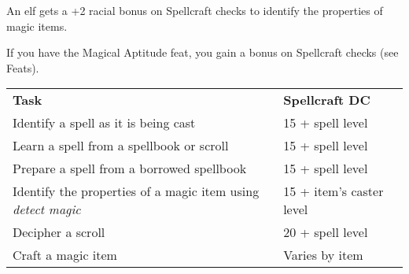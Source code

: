 An elf gets a +2 racial bonus on Spellcraft checks to identify the properties of magic items.
				
If you have the Magical Aptitude feat, you gain a bonus on Spellcraft checks (see Feats).

\begin{table*}
\sffamily
 \begin{tabular}{ll}
\textbf{Task} & \textbf{Spellcraft DC}\\
Identify a spell as it is being cast & 15 + spell level\\
Learn a spell from a spellbook or scroll & 15 + spell level\\
Prepare a spell from a borrowed spellbook & 15 + spell level\\
Identify the properties of a magic item using \textit{detect magic} & 15 + item's caster level\\
Decipher a scroll & 20 + spell level\\
Craft a magic item & Varies by item\\
 \end{tabular}

\end{table*}
